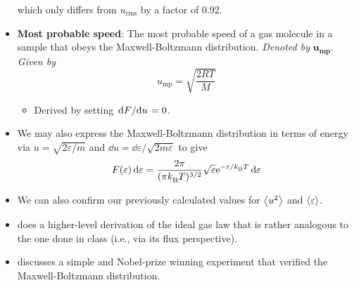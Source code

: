 \documentclass[../notes.tex]{subfiles}
\begin{document}
\begin{itemize}
    which only differs from $u_\text{rms}$ by a factor of 0.92.
    \item \textbf{Most probable speed}: The most probable speed of a gas molecule in a sample that obeys the Maxwell-Boltzmann distribution. \emph{Denoted by} $\bm{u_\text{mp}}$. \emph{Given by}
    \begin{equation*}
        u_\text{mp} = \sqrt{\frac{2RT}{M}}
    \end{equation*}
    \begin{itemize}
        \item Derived by setting $\dv*{F}{u}=0$.
    \end{itemize}
    \item We may also express the Maxwell-Boltzmann distribution in terms of energy via $u=\sqrt{2\varepsilon/m}$ and $\dd{u}=\dd{\varepsilon}/\sqrt{2m\varepsilon}$ to give
    \begin{equation*}
        F(\varepsilon)\dd{\varepsilon} = \frac{2\pi}{(\pi \kB T)^{3/2}}\sqrt{\varepsilon}\e[-\varepsilon/\kB T]\dd{\varepsilon}
    \end{equation*}
    \item We can also confirm our previously calculated values for $\prb{u^2}$ and $\prb{\varepsilon}$.
    \item \textcite{bib:McQuarrieSimon} does a higher-level derivation of the ideal gas law that is rather analogous to the one done in class (i.e., via its flux perspective).
    \item \textcite{bib:McQuarrieSimon} discusses a simple and Nobel-prize winning experiment that verified the Maxwell-Boltzmann distribution.
\end{itemize}
\end{document}
